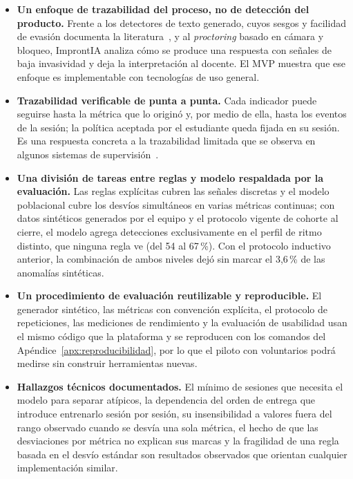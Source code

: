 \begin{itemize}
    \item \textbf{Un enfoque de trazabilidad del proceso, no de detección del producto.} Frente a los detectores de texto generado, cuyos sesgos y facilidad de evasión documenta la literatura~\parencite{Liang2023, Perkins2024}, y al \textit{proctoring} basado en cámara y bloqueo, ImprontIA analiza cómo se produce una respuesta con señales de baja invasividad y deja la interpretación al docente. El MVP muestra que ese enfoque es implementable con tecnologías de uso general.
    \item \textbf{Trazabilidad verificable de punta a punta.} Cada indicador puede seguirse hasta la métrica que lo originó y, por medio de ella, hasta los eventos de la sesión; la política aceptada por el estudiante queda fijada en su sesión. Es una respuesta concreta a la trazabilidad limitada que se observa en algunos sistemas de supervisión~\parencite{Heinrich2025}.
    \item \textbf{Una división de tareas entre reglas y modelo respaldada por la evaluación.} Las reglas explícitas cubren las señales discretas y el modelo poblacional cubre los desvíos simultáneos en varias métricas continuas; con datos sintéticos generados por el equipo y el protocolo vigente de cohorte al cierre, el modelo agrega detecciones exclusivamente en el perfil de ritmo distinto, que ninguna regla ve (del 54 al 67\,\%). Con el protocolo inductivo anterior, la combinación de ambos niveles dejó sin marcar el 3,6\,\% de las anomalías sintéticas.
    \item \textbf{Un procedimiento de evaluación reutilizable y reproducible.} El generador sintético, las métricas con convención explícita, el protocolo de repeticiones, las mediciones de rendimiento y la evaluación de usabilidad usan el mismo código que la plataforma y se reproducen con los comandos del Apéndice~\ref{apx:reproducibilidad}, por lo que el piloto con voluntarios podrá medirse sin construir herramientas nuevas.
    \item \textbf{Hallazgos técnicos documentados.} El mínimo de sesiones que necesita el modelo para separar atípicos, la dependencia del orden de entrega que introduce entrenarlo sesión por sesión, su insensibilidad a valores fuera del rango observado cuando se desvía una sola métrica, el hecho de que las desviaciones por métrica no explican sus marcas y la fragilidad de una regla basada en el desvío estándar son resultados observados que orientan cualquier implementación similar.
\end{itemize}

